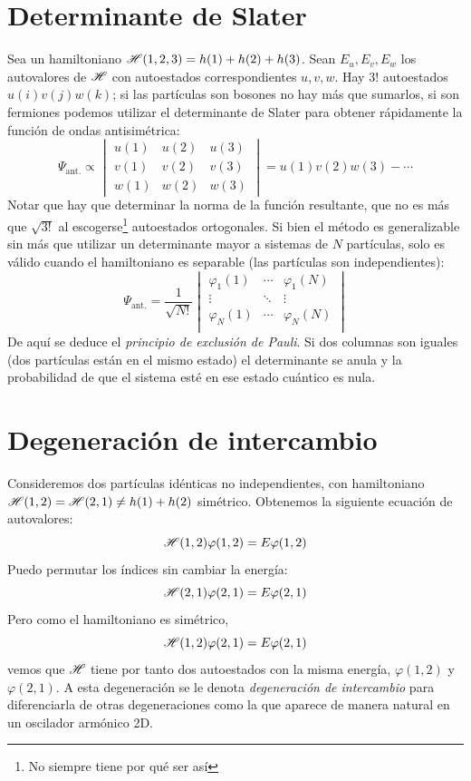 \section{Determinante de Slater}
Sea un hamiltoniano $ \mathscr{H} (1,2,3) = h(1) +
h(2) + h(3)$. Sean $E_u,E_v,E_w$ los autovalores de $ \mathscr{H} $
con autoestados correspondientes $u,v,w$. Hay $3!$ autoestados
$u(i)v(j)w(k)$; si las partículas son bosones no hay más que sumarlos,
si son fermiones podemos utilizar el determinante de Slater para
obtener rápidamente la función de ondas antisimétrica:
\begin{equation}
  \Psi_\text{ant.} \propto
  \begin{vmatrix}
    u(1) & u(2) & u(3) \\
    v(1) & v(2) & v(3) \\
    w(1) & w(2) & w(3) 
  \end{vmatrix} = u(1)v(2)w(3) - \cdots
\end{equation}
Notar que hay que determinar la norma de la función resultante, que no
es más que $\sqrt{3!}$ al escogerse\footnote{No siempre tiene por qué ser así} autoestados
ortogonales. Si bien el
método es generalizable sin más que utilizar un determinante mayor a
sistemas de $N$ partículas, solo es válido cuando el hamiltoniano es
separable (las partículas son independientes):
\begin{equation}
  \Psi_\text{ant.} = \frac{1}{\sqrt{N!}}
  \begin{vmatrix}
    \varphi_1(1) & \cdots & \varphi_1(N) \\
    \vdots & \ddots & \vdots \\
    \varphi_N(1) & \cdots & \varphi_N(N) \\
  \end{vmatrix} 
\end{equation}
De aquí se deduce el \emph{principio de exclusión de Pauli}. Si dos
columnas son iguales (dos partículas están en el mismo estado) el
determinante se anula y la probabilidad de que el sistema esté en ese
estado cuántico es nula.
\section{Degeneración de intercambio}
Consideremos dos partículas idénticas no independientes, con
hamiltoniano $ \mathscr{H} (1,2) =  \mathscr{H} (2,1) \neq h(1) + h(2) $
simétrico. Obtenemos la siguiente ecuación de autovalores:
\begin{equation}
     \mathscr{H} (1,2) \varphi(1,2) = E \varphi(1,2)
\end{equation}
Puedo permutar los índices sin cambiar la energía:
\begin{equation}
     \mathscr{H} (2,1) \varphi(2,1) = E \varphi(2,1)
\end{equation}
Pero como el hamiltoniano es simétrico,
\begin{equation}
     \mathscr{H} (1,2) \varphi(2,1) = E \varphi(2,1)
\end{equation}
vemos que $ \mathscr{H} $ tiene por tanto dos autoestados con la misma
energía, $\varphi(1,2)$ y $\varphi(2,1)$. A esta degeneración se le denota
\emph{degeneración de intercambio} para diferenciarla de otras
degeneraciones como la que aparece de manera natural en un oscilador
armónico 2D.

